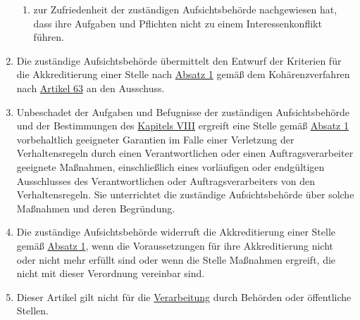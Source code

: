 \begin{enumerate}
\begin{enumerate}
    \item zur Zufriedenheit der zuständigen Aufsichtsbehörde nachgewiesen hat, dass ihre Aufgaben und Pflichten nicht zu
     einem Interessenkonflikt führen.
    \label{itm:41-2d}

  \end{enumerate}

  \item Die zuständige Aufsichtsbehörde übermittelt den Entwurf der Kriterien für die Akkreditierung einer Stelle nach
   \hyperref[itm:41-1]{Absatz 1} gemäß dem Kohärenzverfahren nach \hyperref[ch:63]{Artikel 63} an den Ausschuss.
  \label{itm:41-3}

  \item Unbeschadet der Aufgaben und Befugnisse der zuständigen Aufsichtsbehörde und der Bestimmungen des \hyperref
   [part:8]{Kapitels VIII} ergreift eine Stelle gemäß \hyperref[itm:41-1]{Absatz 1} vorbehaltlich geeigneter Garantien
   im Falle einer Verletzung der Verhaltensregeln durch einen Verantwortlichen oder einen Auftragsverarbeiter geeignete
   Maßnahmen, einschließlich eines vorläufigen oder endgültigen Ausschlusses des Verantwortlichen oder
   Auftragsverarbeiters von den Verhaltensregeln. Sie unterrichtet die zuständige Aufsichtsbehörde über solche
   Maßnahmen und deren Begründung.
  \label{itm:41-4}

  \item Die zuständige Aufsichtsbehörde widerruft die Akkreditierung einer Stelle gemäß \hyperref[itm:41-1]{Absatz 1},
   wenn die Voraussetzungen für ihre Akkreditierung nicht oder nicht mehr erfüllt sind oder wenn die Stelle Maßnahmen
   ergreift, die nicht mit dieser Verordnung vereinbar sind.
  \label{itm:41-5}

  \item Dieser Artikel gilt nicht für die \hyperref[itm:04-2]{Verarbeitung} durch Behörden oder öffentliche Stellen.
  \label{itm:41-6}

\end{enumerate}


